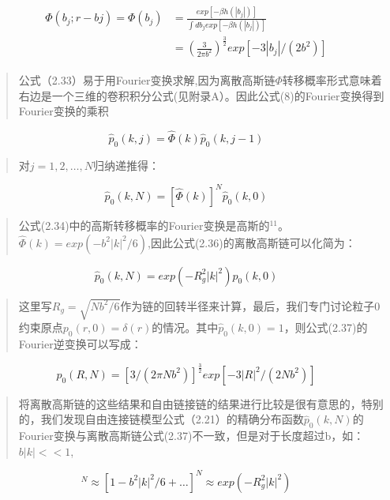 \begin{equation}
\begin{split}
\begin{aligned}
\varPhi(b_{j};r-b{j})=\varPhi(b_{j})&=\frac{exp[-\beta h(|b_{j}|)]}{\int db_{j}exp[-\beta h(|b_{j}|)]} \\ &=(\frac{3}{2 \pi b^2})^{\frac{3}{2}}exp[-3|b_{j}| / (2b^2)]
\end{aligned}
\end{split}
\end{equation}
\begin{quotation}
公式（2.33）易于用Fourier变换求解,因为离散高斯链$\varPhi$转移概率形式意味着右边是一个三维的卷积积分公式(见附录A）。因此公式(8)的Fourier变换得到Fourier变换的乘积
\end{quotation}
\begin{equation}
\hat{p}_{0}(k,j)=\hat{\varPhi}(k)\hat{p}_{0}(k,j-1)
\end{equation}
\begin{quotation}
对$j=1,2,\dots ,N$归纳递推得：
\end{quotation}
\begin{equation}
\hat{p}_{0}(k,N)=[\hat{\varPhi}(k)]^N\hat{p}_{0}(k,0)
\end{equation}
\begin{quotation}
公式(2.34)中的高斯转移概率的Fourier变换是高斯的$^{11}$。$\hat{\varPhi}(k)=exp(-b^2|k|^2/6)$,因此公式(2.36)的离散高斯链可以化简为：
\end{quotation}
\begin{equation}
\hat{p}_{0}(k,N)=exp(-R_{g}^2|k|^2)\hat{p}_{0}(k,0)
\end{equation}
\begin{quotation}
这里写$R_{g}=\sqrt{Nb^2/6}$作为链的回转半径来计算，最后，我们专门讨论粒子0约束原点$p_{0}(r,0)=\delta(r)$的情况。其中$\hat{p}_{0}(k,0)=1$，则公式(2.37)的Fourier逆变换可以写成：
\end{quotation}
\begin{equation}
p_{0}(R,N)=[3/(2\pi Nb^2)]^\frac{3}{2}exp[-3|R|^2/(2Nb^2)]
\end{equation}
\begin{quotation}
将离散高斯链的这些结果和自由链接链的结果进行比较是很有意思的，特别的，我们发现自由连接链模型公式（2.21）的精确分布函数$\hat{p}_{0}(k,N)$的Fourier变换与离散高斯链公式(2.37)不一致，但是对于长度超过b，如：$b|k|<<1$,
\end{quotation}
\begin{equation}
[j_{0}(b|k|)]^N\approx [1-b^2|k|^2/6+\dots]^N\approx exp(-R_{g}^2|k|^2)
\end{equation}
